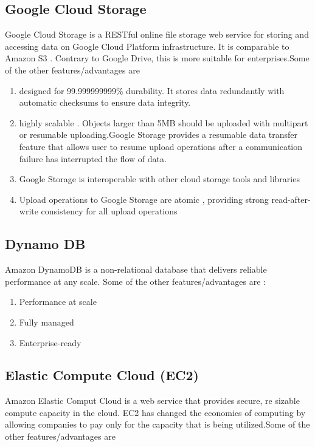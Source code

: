 \documentclass[journal]{hybrid-cloud}
\begin{document}
\subsection{Google Cloud Storage}

Google Cloud Storage is a RESTful online file storage web service for storing and accessing data on Google Cloud Platform infrastructure. It is comparable to Amazon S3 . Contrary to Google Drive, this is more suitable for enterprises.Some of the other features/advantages are \cite{googlestorage}

\begin{enumerate}
	\item designed for 99.999999999\% durability. It stores data redundantly with automatic checksums to ensure data integrity.
	\item highly scalable . Objects larger than 5MB should be uploaded with multipart or resumable uploading.Google Storage provides a resumable data transfer feature that allows user to resume upload operations after a communication failure has interrupted the flow of data.
	\item Google Storage is interoperable with other cloud storage tools and libraries
	\item  Upload operations to Google Storage are atomic , providing strong read-after-write consistency for all upload operations
\end{enumerate}

\subsection{Dynamo DB} 
Amazon DynamoDB is a non-relational database that delivers reliable performance at any scale. Some of the other features/advantages are :\cite{DynamoDBDoc}

\begin{enumerate}
	\item Performance at scale
	\item Fully managed
	\item Enterprise-ready
\end{enumerate}

\subsection{Elastic Compute Cloud (EC2)} 
Amazon Elastic Comput Cloud is a web service that provides secure, re sizable compute capacity in the cloud. EC2 has changed the economics of computing by allowing companies to pay only for the capacity that is being utilized.Some of the other features/advantages are \cite{EC2Doc}
\end{document}
